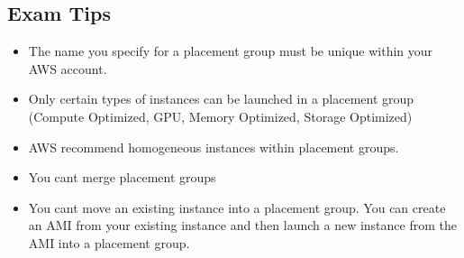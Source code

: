 \documentclass{article}
\begin{document}
\subsection{Exam Tips}
\begin{itemize}
\item
The name you specify for a placement group must be unique within your AWS account.

\item
Only certain types of instances can be launched in a placement group (Compute Optimized, GPU, Memory Optimized, Storage Optimized)

\item
AWS recommend homogeneous instances within placement groups.

\item
You cant merge placement groups

\item
You cant move an existing instance into a placement group. You can create an AMI from your existing instance and then launch a new instance from the AMI into a placement group.

\end{itemize}
\end{document}
